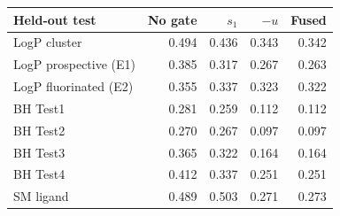 \begin{tabular}{@{}lrrrr@{}}
\toprule
Held-out test & No gate & $s_1$ & $-u$ & Fused \\
\midrule
LogP cluster & 0.494 & 0.436 & 0.343 & 0.342 \\
LogP prospective (E1) & 0.385 & 0.317 & 0.267 & 0.263 \\
LogP fluorinated (E2) & 0.355 & 0.337 & 0.323 & 0.322 \\
BH Test1 & 0.281 & 0.259 & 0.112 & 0.112 \\
BH Test2 & 0.270 & 0.267 & 0.097 & 0.097 \\
BH Test3 & 0.365 & 0.322 & 0.164 & 0.164 \\
BH Test4 & 0.412 & 0.337 & 0.251 & 0.251 \\
SM ligand & 0.489 & 0.503 & 0.271 & 0.273 \\
\bottomrule
\end{tabular}